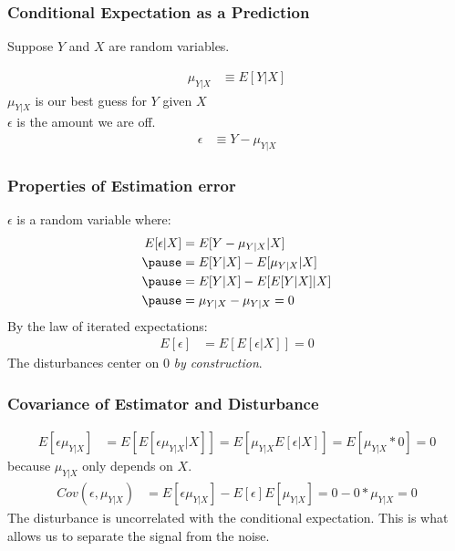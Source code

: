\documentclass[aspectratio=169, handout]{beamer}
\numberwithin{equation}{section}
\begin{document}
\begin{frame}
\frametitle{Conditional Expectation as a Prediction}
Suppose $Y$ and $X$ are random variables.

\begin{align*}
\mu_{Y|X}& \equiv  E[Y|X] 
\end{align*}\pause
$\mu_{Y|X}$ is our best guess for $Y$ given $X$\\\pause
$\epsilon$ is the amount we are off.
\begin{align*}
\epsilon & \equiv Y-\mu_{Y|X}
\end{align*}


\end{frame}


\begin{frame}
\frametitle{Properties of Estimation error}
$\epsilon$ is a random variable where:
\begin{align*}
E[\epsilon|X] & =  E[Y- \mu_{Y|X}|X] \\\pause
 & =  E[Y|X]-E[ \mu_{Y|X}|X] \\\pause
  & =   E[Y|X]-E[ E[Y|X]|X]\\\pause
  & =  \mu_{Y|X} -\mu_{Y|X} =0 
\end{align*}\pause
By the law of iterated expectations:\pause
\begin{align*}
E[\epsilon] & =  E[E[ \epsilon|X]]=0
\end{align*}\pause
The disturbances center on 0 \emph{by construction}.  

\end{frame}


\begin{frame}
\frametitle{Covariance of  Estimator and Disturbance}
\begin{align*}
E[\epsilon \mu_{Y|X}] & =  E[E[\epsilon \mu_{Y|X}|X]]=E[\mu_{Y|X}E[\epsilon|X]]=E[\mu_{Y|X}*0]=0 
\end{align*}\pause
because $\mu_{Y|X}$ only depends on $X$.\pause
\begin{align*}
Cov(\epsilon , \mu_{Y|X}) & =  E[ \epsilon \mu_{Y|X}]-E[\epsilon ]E[\mu_{Y|X}]=0- 0*\mu_{Y|X}=0
\end{align*}\pause
The disturbance is uncorrelated with the conditional expectation.  This is what allows us to separate the signal from the noise.
\end{frame}
\end{document}
